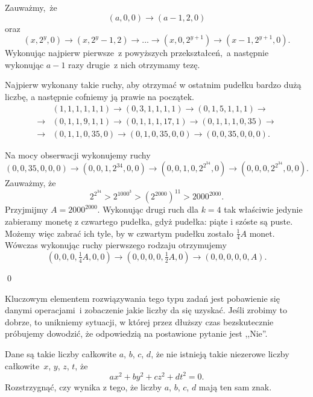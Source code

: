 \vspace{5px}
\noindent
Zauważmy,~że
\[
	(a, 0, 0) \rightarrow (a - 1, 2, 0)
\]
oraz
\[
	(x, 2^y, 0) \rightarrow (x, 2^y - 1, 2) \rightarrow ... \rightarrow (x, 0, 2^{y + 1}) \rightarrow (x - 1, 2^{y + 1}, 0).
\]
Wykonując najpierw pierwsze~z powyższych przekształceń,~a następnie wykonując ${a - 1}$ razy drugie~z nich otrzymamy tezę.

\vspace{10px}
\noindent
Najpierw wykonany takie ruchy, aby otrzymać w ostatnim pudełku bardzo dużą liczbę, a następnie cofniemy ją prawie na początek.
\begin{align*}
	&(1, 1, 1, 1, 1, 1) \rightarrow (0, 3, 1, 1, 1, 1) \rightarrow (0, 1, 5, 1, 1, 1)  \rightarrow \\
	\rightarrow &(0, 1, 1, 9, 1, 1)  \rightarrow (0, 1, 1, 1, 17, 1)  \rightarrow (0, 1, 1, 1, 0, 35) \rightarrow \\
	\rightarrow  &(0, 1, 1, 0, 35, 0)  \rightarrow (0, 1, 0, 35, 0, 0)  \rightarrow (0, 0, 35, 0, 0, 0).
\end{align*}

\noindent
Na mocy obserwacji wykonujemy ruchy
\[
	 (0, 0, 35, 0, 0, 0) \rightarrow  (0, 0, 1, 2^{34}, 0, 0) \rightarrow  (0, 0, 1, 0, 2^{2^{34}}, 0) \rightarrow  (0, 0, 0, 2^{2^{34}}, 0 , 0).
\]
Zauważmy, że 
\[
	2^{2^{34}} > 2^{1000^3} > \left(2^{2000}\right)^{11} > 2000^{2000}.
\] 
Przyjmijmy $A = 2000^{2000}$. Wykonując drugi ruch dla $k = 4$ tak właściwie jedynie zabieramy monetę z czwartego pudełka, gdyż pudełka: piąte i szóste są puste. Możemy więc zabrać ich tyle, by w czwartym pudełku zostało $\frac{1}{4}A$ monet. Wówczas wykonując ruchy pierwszego rodzaju otrzymujemy
\[
	(0, 0, 0, \tfrac{1}{4}A, 0, 0) \rightarrow (0, 0, 0, 0, \tfrac{1}{2}A, 0) \rightarrow (0, 0, 0, 0, 0, A).
\]

\qed

\noindent
Kluczowym elementem rozwiązywania tego typu zadań jest pobawienie się danymi operacjami~i zobaczenie jakie liczby da się uzyskać. Jeśli zrobimy to dobrze, to unikniemy sytuacji, w której przez dłuższy czas bezskutecznie próbujemy dowodzić, że odpowiedzią na postawione pytanie jest ,,Nie''.

\vspace{5px}



\noindent
Dane są takie liczby całkowite $a$, $b$, $c$, $d$, że nie istnieją takie niezerowe liczby całkowite~$x$, $y$, $z$, $t$, że
\[
	ax^2 + by^2 + cz^2 + dt^2 = 0.
\]
Rozstrzygnąć, czy wynika z tego, że liczby $a$, $b$, $c$, $d$ mają ten sam znak.

